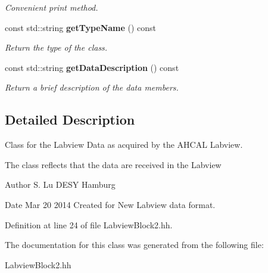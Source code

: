 \begin{DoxyCompactItemize}
\begin{DoxyCompactList}\small\item\em Convenient print method. \end{DoxyCompactList}\item 
const std\-::string {\bf get\-Type\-Name} () const \label{classCALICE_1_1LabviewBlock2_a76502d161af6719c26997c8636fc5fa3}

\begin{DoxyCompactList}\small\item\em Return the type of the class. \end{DoxyCompactList}\item 
const std\-::string {\bf get\-Data\-Description} () const \label{classCALICE_1_1LabviewBlock2_aca62c674b9814b65e27baa3b8d11b5dc}

\begin{DoxyCompactList}\small\item\em Return a brief description of the data members. \end{DoxyCompactList}\end{DoxyCompactItemize}


\subsection{Detailed Description}
Class for the Labview Data as acquired by the A\-H\-C\-A\-L Labview. 

The class reflects that the data are received in the Labview \begin{DoxyAuthor}{Author}
S. Lu D\-E\-S\-Y Hamburg 
\end{DoxyAuthor}
\begin{DoxyDate}{Date}
Mar 20 2014 Created for New Labview data format. 
\end{DoxyDate}


Definition at line 24 of file Labview\-Block2.\-hh.



The documentation for this class was generated from the following file\-:\begin{DoxyCompactItemize}
\item 
Labview\-Block2.\-hh\end{DoxyCompactItemize}
